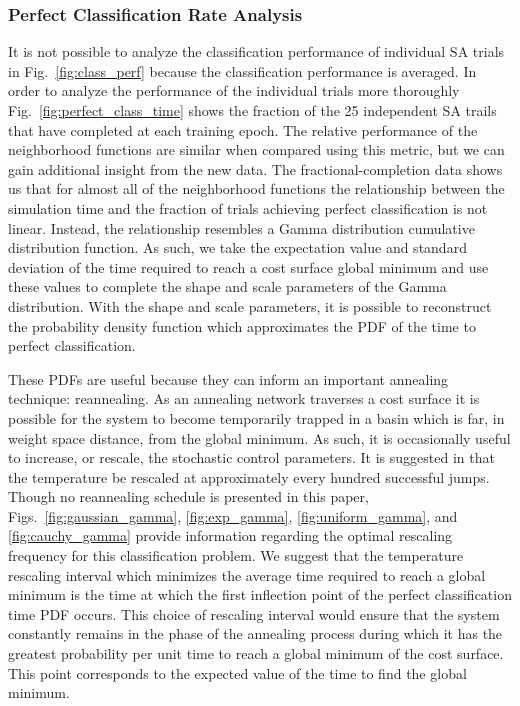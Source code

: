 \documentclass[10pt,journal,cspaper,compsoc]{IEEEtran}
\begin{document}
\subsubsection{Perfect Classification Rate Analysis}

It is not possible to analyze the classification performance of individual SA trials in Fig.~\ref{fig:class_perf} because the classification performance is averaged. In order to analyze the performance of the individual trials more thoroughly Fig.~\ref{fig:perfect_class_time} shows the fraction of the 25 independent SA trails that have completed at each training epoch. The relative performance of the neighborhood functions are similar when compared using this metric, but we can gain additional insight from the new data. The fractional-completion data shows us that for almost all of the neighborhood functions the relationship between the simulation time and the fraction of trials achieving perfect classification is not linear. Instead, the relationship resembles a Gamma distribution cumulative distribution function. As such, we take the expectation value and standard deviation of the time required to reach a cost surface global minimum and use these values to complete the shape and scale parameters of the Gamma distribution. With the shape and scale parameters, it is possible to reconstruct the probability density function which approximates the PDF of the time to perfect classification.
 

These PDFs are useful because they can inform an important annealing technique: reannealing. As an annealing network traverses a cost surface it is possible for the system to become temporarily trapped in a basin which is far, in weight space distance, from the global minimum. As such, it is occasionally useful to increase, or rescale, the stochastic control parameters. It is suggested in \cite{ingber1989veryfastsimulatedreannealing} that the temperature be rescaled at approximately every hundred successful jumps. Though no reannealing schedule is presented in this paper, Figs.~\ref{fig:gaussian_gamma}, \ref{fig:exp_gamma}, \ref{fig:uniform_gamma}, and \ref{fig:cauchy_gamma} provide information regarding the optimal rescaling frequency for this classification problem. We suggest that the temperature rescaling interval which minimizes the average time required to reach a global minimum is the time at which the first inflection point of the perfect classification time PDF occurs. This choice of rescaling interval would ensure that the system constantly remains in the phase of the annealing process during which it has the greatest probability per unit time to reach a global minimum of the cost surface. This point corresponds to the expected value of the time to find the global minimum.
\end{document}
